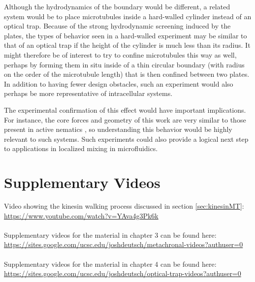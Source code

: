 \documentclass[11pt]{ucthesis}
\begin{document}
Although the hydrodynamics of the boundary would be different, a related system would be to place microtubules inside a hard-walled cylinder instead of an optical trap. Because of the strong hydrodynamic screening induced by the plates, the types of behavior seen in a hard-walled experiment may be similar to that of an optical trap if the height of the cylinder is much less than its radius. It might therefore be of interest to try to confine microtubules this way as well, perhaps by forming them in situ inside of a thin circular boundary (with radius on the order of the microtubule length) that is then confined between two plates. In addition to having fewer design obstacles, such an experiment would also perhaps be more representative of intracellular systems.

The experimental confirmation of this effect would have important implications. For instance, the core forces and geometry of this work are very similar to those present in active nematics  \cite{sanchez2012spontaneous,decamp2015orientational}, so understanding this behavior would be highly relevant to such systems. Such experiments could also provide a logical next step to applications in localized mixing in microfluidics.


\nocite{*}



\appendix
\chapter{Supplementary Videos}
\noindent
Video showing the kinesin walking process discussed in section \ref{sec:kinesinMT}:\\
\url{https://www.youtube.com/watch?v=YAva4g3Pk6k}\\ \\
Supplementary videos for the material in chapter 3 can be found here:\\
\url{https://sites.google.com/ucsc.edu/joshdeutsch/metachronal-videos?authuser=0}\\ \\
Supplementary videos for the material in chapter 4 can be found here:\\
\url{https://sites.google.com/ucsc.edu/joshdeutsch/optical-trap-videos?authuser=0}
\end{document}
